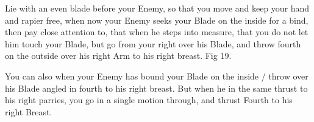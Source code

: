 \newpage


\newpage





Lie with an even blade before your Enemy, so that you move and keep
your hand and rapier free, when now your Enemy seeks your Blade on the
inside for a bind, then pay close attention to, that when he steps
into measure, that you do not let him touch your Blade, but go from
your right over his Blade, and throw fourth on the outside over his
right Arm to his right breast. Fig 19.

\exercise{}


You can also when your Enemy has bound your Blade on the inside /
throw over his Blade angled in fourth to his right breast. But when he
in the same thrust to his right parries, you go in a single motion
through, and thrust Fourth to his right Breast.

\exercise{}


